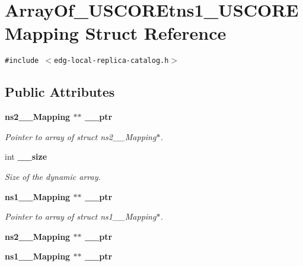 \section{Array\-Of\_\-USCOREtns1\_\-USCOREMapping Struct Reference}
\label{structArrayOf__USCOREtns1__USCOREMapping}
{\tt \#include $<$edg-local-replica-catalog.h$>$}

\subsection*{Public Attributes}
\begin{CompactItemize}
\item 
\bf{ns2\_\-\_\-Mapping} $\ast$$\ast$ \bf{\_\-\_\-ptr}\label{structArrayOf__USCOREtns1__USCOREMapping_4378767e5140607e9f8e17537a995a1d}

\begin{CompactList}\small\item\em Pointer to array of struct ns2\_\-\_\-Mapping$\ast$. \item\end{CompactList}\item 
int \bf{\_\-\_\-size}\label{structArrayOf__USCOREtns1__USCOREMapping_36d7896ff6354a1474c7aa4d357172f7}

\begin{CompactList}\small\item\em Size of the dynamic array. \item\end{CompactList}\item 
\bf{ns1\_\-\_\-Mapping} $\ast$$\ast$ \bf{\_\-\_\-ptr}\label{structArrayOf__USCOREtns1__USCOREMapping_aba21126fb8acacfdb80635288b6e4ee}

\begin{CompactList}\small\item\em Pointer to array of struct ns1\_\-\_\-Mapping$\ast$. \item\end{CompactList}\item 
\bf{ns2\_\-\_\-Mapping} $\ast$$\ast$ \textbf{\_\-\_\-ptr}\label{structArrayOf__USCOREtns1__USCOREMapping_1df98a0f198288428e6fd348a705fa62}

\item 
\bf{ns1\_\-\_\-Mapping} $\ast$$\ast$ \textbf{\_\-\_\-ptr}\label{structArrayOf__USCOREtns1__USCOREMapping_0e55efcda09596a379eb2465ebf1e145}

\end{CompactItemize}


